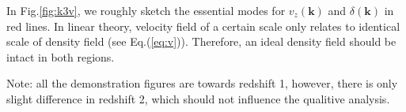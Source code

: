 In Fig.\ref{fig:k3v}, we roughly sketch the essential modes 
for $v_z(\bm{k})$ and $\delta(\bm{k})$ 
in red lines. 
In linear theory, velocity field of a certain scale only relates to 
identical scale of density field (see Eq.(\ref{eq:v})). 
Therefore, an ideal density field should be intact in both regions. 

Note: all the demonstration figures are towards redshift 1, 
however, there is only slight difference  
in redshift 2, 
which should not influence the qualitive analysis.
